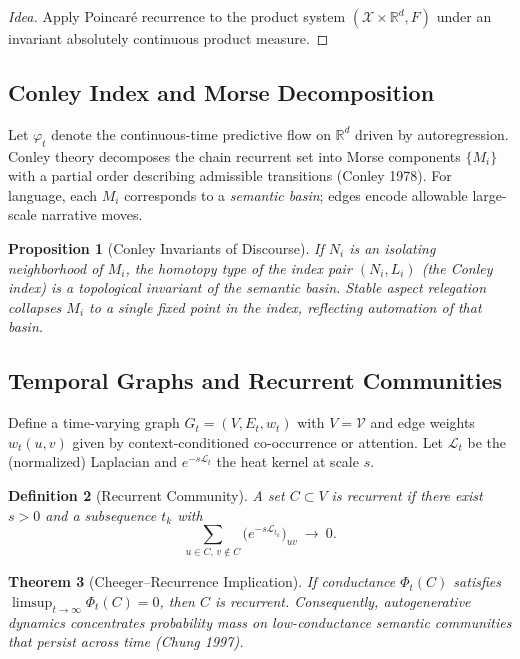 \documentclass[12pt,a4paper,twoside,openright]{book}
\newtheorem{theorem}{Theorem}
\newtheorem{proposition}[theorem]{Proposition}
\newtheorem{definition}[theorem]{Definition}
\begin{document}
\begin{proof}[Idea]
Apply Poincaré recurrence to the product system $(\mathcal{X}\times \mathbb{R}^d,F)$ under an invariant absolutely continuous product measure.
\end{proof}

\subsection{Conley Index and Morse Decomposition}
Let $\varphi_t$ denote the continuous-time predictive flow on $\mathbb{R}^d$ driven by autoregression.
Conley theory decomposes the chain recurrent set into Morse components $\{M_i\}$ with a partial order describing admissible transitions (Conley 1978).
For language, each $M_i$ corresponds to a \emph{semantic basin}; edges encode allowable large-scale narrative moves.

\begin{proposition}[Conley Invariants of Discourse]
If $N_i$ is an isolating neighborhood of $M_i$, the homotopy type of the index pair $(N_i,L_i)$ (the Conley index) is a topological invariant of the semantic basin.
Stable aspect relegation collapses $M_i$ to a single fixed point in the index, reflecting automation of that basin.
\end{proposition}

\subsection{Temporal Graphs and Recurrent Communities}
Define a time-varying graph $G_t=(V,E_t,w_t)$ with $V=\mathcal{V}$ and edge weights $w_t(u,v)$ given by context-conditioned co-occurrence or attention.
Let $\mathcal{L}_t$ be the (normalized) Laplacian and $e^{-s\mathcal{L}_t}$ the heat kernel at scale $s$.

\begin{definition}[Recurrent Community]
A set $C\subset V$ is recurrent if there exist $s>0$ and a subsequence $t_k$ with
\[
\sum_{u\in C,\,v\notin C} \big(e^{-s\mathcal{L}_{t_k}}\big)_{uv}\ \to\ 0.
\]
\end{definition}

\begin{theorem}[Cheeger–Recurrence Implication]
If conductance $\Phi_t(C)$ satisfies $\limsup_{t\to\infty}\Phi_t(C)=0$, then $C$ is recurrent.
Consequently, autogenerative dynamics concentrates probability mass on low-conductance semantic communities that persist across time (Chung 1997).
\end{theorem}
\end{document}
